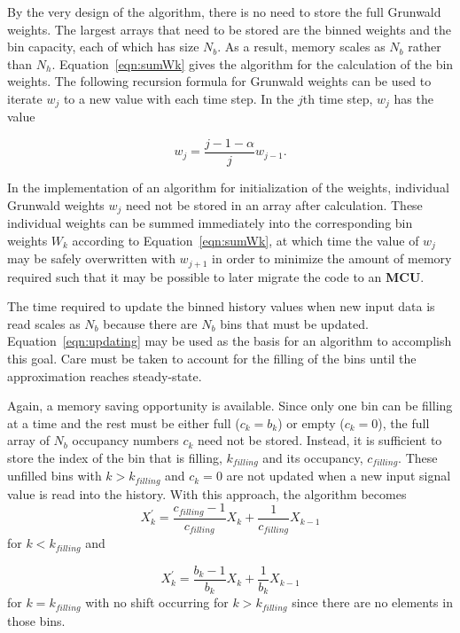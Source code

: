By the very design of the algorithm, there is no need to store the
full Grunwald weights. The largest arrays that need to be stored are
the binned weights and the bin capacity, each of which has size
$N_b$. As a result, memory scales as $N_b$ rather than
$N_h$. Equation~\ref{eqn:sumWk} gives the algorithm for the calculation
of the bin weights. The following recursion formula for Grunwald
weights can be used to iterate $w_j$ to a new value with each time
step. In the $j$th time step, $w_j$ has the value

\begin{equation}
w_j = \frac{j-1-\alpha}{j}w_{j-1}.
\label{eqn:GrunwaldRecursion}
\end{equation}

In the implementation of an algorithm for initialization of the
weights, individual Grunwald weights $w_j$ need not be stored in an
array after calculation. These individual weights can be summed
immediately into the corresponding bin weights $W_k$ according to
Equation~\ref{eqn:sumWk}, at which time the value of $w_j$ may be
safely overwritten with $w_{j+1}$ in order to minimize the amount of
memory required such that it may be possible to later migrate the code
to an {\bf MCU}.

The time required to update the binned history values when new input
data is read scales as $N_b$ because there are $N_b$ bins that must be
updated. Equation~\ref{eqn:updating} may be used as the basis for an
algorithm to accomplish this goal. Care must be taken to account for
the filling of the bins until the approximation reaches steady-state.

Again, a memory saving opportunity is available. Since only one bin
can be filling at a time and the rest must be either full ($c_k=b_k$)
or empty ($c_k=0$), the full array of $N_b$ occupancy numbers $c_k$
need not be stored. Instead, it is sufficient to store the index of
the bin that is filling, $k_{filling}$ and its occupancy,
$c_{filling}$. These unfilled bins with $k>k_{filling}$ and $c_k=0$
are not updated when a new input signal value is read into the
history. With this approach, the algorithm becomes
\begin{equation}
X_k^\prime = \frac{c_{filling}-1}{c_{filling}}X_k + \frac{1}{c_{filling}}X_{k-1}
\label{eqn:shift1}
\end{equation}
for $k<k_{filling}$ and

\begin{equation}
X_k^\prime = \frac{b_k-1}{b_k}X_k + \frac{1}{b_k}X_{k-1}
\label{eqn:shift2}
\end{equation}
for $k=k_{filling}$ with no shift occurring for $k>k_{filling}$ since
there are no elements in those bins.

